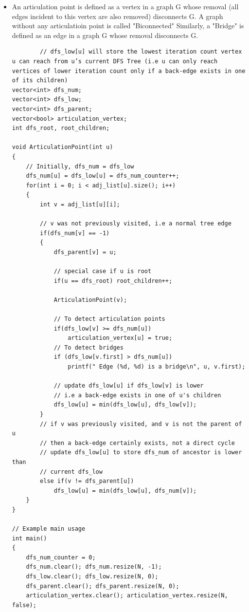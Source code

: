 \documentclass[8pt, a4paper, oneside, twocolumn]{extarticle}
\begin{document}
\begin{itemize}
    \item An articulation point is defined as a vertex in a graph G whose removal (all edges incident to this vertex are also removed) disconnects G. A graph without any articulatioin point is called "Biconnected" Similarly, a "Bridge" is defined as an edge in a graph G whose removal disconnects G.
    \begin{verbatim}
        // dfs_low[u] will store the lowest iteration count vertex u can reach from u’s current DFS Tree (i.e u can only reach vertices of lower iteration count only if a back-edge exists in one of its children)
vector<int> dfs_num;
vector<int> dfs_low;
vector<int> dfs_parent;
vector<bool> articulation_vertex;
int dfs_root, root_children;

void ArticulationPoint(int u)
{
    // Initially, dfs_num = dfs_low
    dfs_num[u] = dfs_low[u] = dfs_num_counter++;
    for(int i = 0; i < adj_list[u].size(); i++)
    {
        int v = adj_list[u][i];
        
        // v was not previously visited, i.e a normal tree edge
        if(dfs_num[v] == -1)
        {
            dfs_parent[v] = u;
            
            // special case if u is root
            if(u == dfs_root) root_children++;

            ArticulationPoint(v);
            
            // To detect articulation points
            if(dfs_low[v] >= dfs_num[u])
                articulation_vertex[u] = true;
            // To detect bridges
            if (dfs_low[v.first] > dfs_num[u])
                printf(" Edge (%d, %d) is a bridge\n", u, v.first);
            
            // update dfs_low[u] if dfs_low[v] is lower
            // i.e a back-edge exists in one of u's children
            dfs_low[u] = min(dfs_low[u], dfs_low[v]);
        }
        // if v was previously visited, and v is not the parent of u
        // then a back-edge certainly exists, not a direct cycle
        // update dfs_low[u] to store dfs_num of ancestor is lower than
        // current dfs_low
        else if(v != dfs_parent[u])
            dfs_low[u] = min(dfs_low[u], dfs_num[v]);
    }
}

// Example main usage
int main() 
{
    dfs_num_counter = 0;
    dfs_num.clear(); dfs_num.resize(N, -1);
    dfs_low.clear(); dfs_low.resize(N, 0);
    dfs_parent.clear(); dfs_parent.resize(N, 0);
    articulation_vertex.clear(); articulation_vertex.resize(N, false);


\end{verbatim}
\end{itemize}
\end{document}
